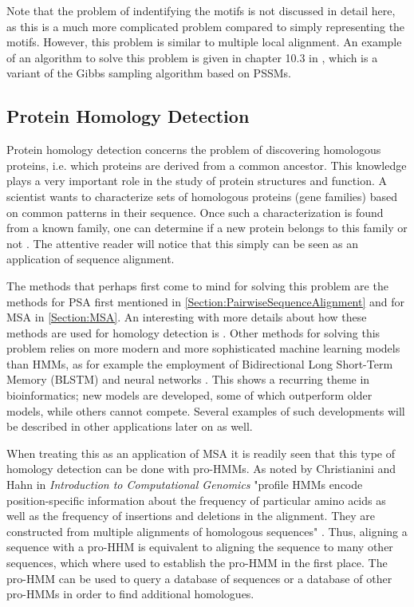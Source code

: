 \documentclass{article}\usepackage[]{graphicx}\usepackage[]{color}
\begin{document}
Note that the problem of indentifying the motifs is not discussed in detail here, as this is a much more complicated problem compared to simply representing the motifs. However, this problem is similar to multiple local alignment. An example of an algorithm to solve this problem is given in chapter 10.3 in \cite{Christianini2006}, which is a variant of the Gibbs sampling algorithm based on PSSMs. 

\subsection{Protein Homology Detection}\label{Section:ProtHomoDetect}
Protein homology detection concerns the problem of discovering homologous proteins, i.e. which proteins are derived from a common ancestor. This knowledge plays a very important role in the study of protein structures and function. A scientist wants to characterize sets of homologous proteins (gene families) based on common patterns in their sequence. Once such a characterization is found from a known family, one can determine if a new protein belongs to this family or not \cite{Christianini2006}. The attentive reader will notice that this simply can be seen as an application of sequence alignment. 

The methods that perhaps first come to mind for solving this problem are the methods for PSA first mentioned in \ref{Section:PairwiseSequenceAlignment} and for MSA in \ref{Section:MSA}. An interesting with more details about how these methods are used for homology detection is \cite{Pearson2013}. Other methods for solving this problem relies on more modern and more sophisticated machine learning models than HMMs, as for example the employment of Bidirectional Long Short-Term Memory (BLSTM) and neural networks \cite{Li2017}. This shows a recurring theme in bioinformatics; new models are developed, some of which outperform older models, while others cannot compete. Several examples of such developments will be described in other applications later on as well. 

When treating this as an application of MSA it is readily seen that this type of homology detection can be done with pro-HMMs. As noted by Christianini and Hahn in \textit{Introduction to Computational Genomics} "proﬁle HMMs encode position-speciﬁc information about the frequency of particular amino acids as well as the frequency of insertions and deletions in the alignment. They are constructed from multiple alignments
of homologous sequences" \cite{Christianini2006}. Thus, aligning a sequence with a pro-HHM is equivalent to aligning the sequence to many other sequences, which where used to establish the pro-HMM in the first place. The pro-HMM can be used to query a database of sequences or a database of other pro-HMMs in order to find additional homologues. 
\end{document}
